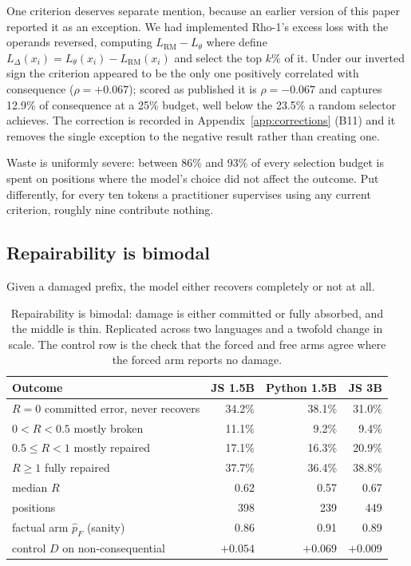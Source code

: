 \documentclass[twoside,11pt]{article}
\begin{document}
One criterion deserves separate mention, because an earlier version of this paper reported it
as an exception. We had implemented Rho-1's excess loss with the operands reversed, computing
$L_{\mathrm{RM}} - L_\theta$ where \citet{lin2024rho} define
$L_\Delta(x_i) = L_\theta(x_i) - L_{\mathrm{RM}}(x_i)$ and select the top $k\%$ of it. Under our
inverted sign the criterion appeared to be the only one positively correlated with consequence
($\rho = +0.067$); scored as published it is $\rho = -0.067$ and captures 12.9\% of consequence at a
25\% budget, well below the 23.5\% a random selector achieves. The correction is recorded in
Appendix~\ref{app:corrections} (B11) and it removes the single exception to the negative result
rather than creating one.

Waste is uniformly severe: between 86\% and 93\% of every selection budget is spent on positions
where the model's choice did not affect the outcome. Put differently, for every ten tokens a
practitioner supervises using any current criterion, roughly nine contribute nothing.

\subsection{Repairability is bimodal}

Given a damaged prefix, the model either recovers completely or not at all.

\begin{table}[h]
\centering\small
\begin{tabular}{lrrr}
\toprule
Outcome & JS 1.5B & Python 1.5B & JS 3B \\
\midrule
$R=0$ \quad committed error, never recovers & 34.2\% & 38.1\% & 31.0\% \\
$0<R<0.5$ \quad mostly broken                & 11.1\% &  9.2\% &  9.4\% \\
$0.5\le R<1$ \quad mostly repaired           & 17.1\% & 16.3\% & 20.9\% \\
$R\ge 1$ \quad fully repaired                & 37.7\% & 36.4\% & 38.8\% \\
\midrule
median $R$                                   & 0.62 & 0.57 & 0.67 \\
positions                                    & 398 & 239 & 449 \\
factual arm $\hat p_F$ (sanity)              & 0.86 & 0.91 & 0.89 \\
control $D$ on non-consequential             & $+0.054$ & $+0.069$ & $+0.009$ \\
\bottomrule
\end{tabular}
\caption{Repairability is bimodal: damage is either committed or fully absorbed, and the middle is
thin. Replicated across two languages and a twofold change in scale. The control row is the check
that the forced and free arms agree where the forced arm reports no damage.}
\label{tab:repair}
\end{table}
\end{document}
